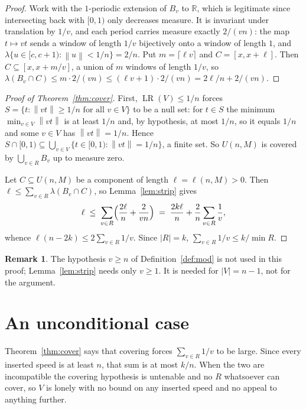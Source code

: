 \documentclass[11pt]{amsart}
\theoremstyle{plain}
\theoremstyle{definition}
\newtheorem{remark}[theorem]{Remark}
\newcommand{\LR}{\operatorname{LR}}
\newcommand{\nrm}[1]{\left\lVert #1 \right\rVert}
\newcommand{\R}{\mathbb{R}}
\begin{document}
\begin{proof}
Work with the $1$-periodic extension of $B_v$ to $\R$, which is legitimate since intersecting back
with $[0,1)$ only decreases measure. It is invariant under translation by $1/v$, and each period
carries measure exactly $2/(vn)$:
the map $t\mapsto vt$ sends a window of length $1/v$ bijectively onto a window of length $1$, and
$\lambda\{u\in[c,c+1):\nrm{u}<1/n\}=2/n$. Put $m=\lceil \ell v\rceil$ and $C=[x,x+\ell]$. Then
$C\subseteq[x,x+m/v]$, a union of $m$ windows of length $1/v$, so
$\lambda(B_v\cap C)\le m\cdot 2/(vn)\le(\ell v+1)\cdot 2/(vn)=2\ell/n+2/(vn)$.
\end{proof}

\begin{proof}[Proof of Theorem~\ref{thm:cover}]
First, $\LR(V)\le 1/n$ forces $S=\{t:\nrm{vt}\ge1/n\text{ for all }v\in V\}$ to be a null set: for
$t\in S$ the minimum $\min_{v\in V}\nrm{vt}$ is at least $1/n$ and, by hypothesis, at most $1/n$, so
it equals $1/n$ and some $v\in V$ has $\nrm{vt}=1/n$. Hence
$S\cap[0,1)\subseteq\bigcup_{v\in V}\{t\in[0,1):\nrm{vt}=1/n\}$, a finite set. So $U(n,M)$ is covered by
$\bigcup_{v\in R}B_v$ up to measure zero.

Let $C\subseteq U(n,M)$ be a component of length $\ell=\ell(n,M)>0$. Then
$\ell\le\sum_{v\in R}\lambda(B_v\cap C)$, so Lemma~\ref{lem:strip} gives
\[
  \ell\;\le\;\sum_{v\in R}\Bigl(\frac{2\ell}{n}+\frac{2}{vn}\Bigr)
   \;=\;\frac{2k\ell}{n}+\frac2n\sum_{v\in R}\frac1v ,
\]
whence $\ell(n-2k)\le 2\sum_{v\in R}1/v$. Since $|R|=k$, $\sum_{v\in R}1/v\le k/\min R$.
\end{proof}

\begin{remark}
The hypothesis $v\ge n$ of Definition~\ref{def:mod} is not used in this proof; Lemma~\ref{lem:strip}
needs only $v\ge1$. It is needed for $|V|=n-1$, not for the argument.
\end{remark}

\section{An unconditional case}\label{sec:uncond}

Theorem~\ref{thm:cover} says that covering forces $\sum_{v\in R}1/v$ to be large. Since every
inserted speed is at least $n$, that sum is at most $k/n$. When the two are incompatible the
covering hypothesis is untenable and no $R$ whatsoever can cover, so $V$ is lonely with no bound on
any inserted speed and no appeal to anything further.
\end{document}
